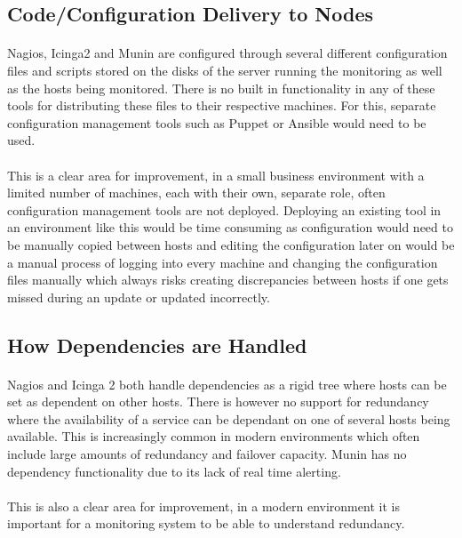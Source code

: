 \documentclass[bsc,logo,twoside,singlespacing,notimes]{infthesis}
\begin{document}
\subsection{Code/Configuration Delivery to Nodes}
\paragraph*{}
	Nagios, Icinga2 and Munin are configured through several different
	configuration files and scripts stored on the disks of the server running the
	monitoring as well as the hosts being monitored.  There is no built in
	functionality in any of these tools for distributing these files to their
	respective machines.  For this, separate configuration management tools such as
	Puppet or Ansible would need to be used.
	
\paragraph*{}
	This is a clear area for improvement, in a small business environment with a
	limited number of machines, each with their own, separate role, often
	configuration management tools are not deployed.  Deploying an existing tool
	in an environment like this would be time consuming as configuration would need
	to be manually copied between hosts and editing the configuration later on
	would be a manual process of logging into every machine and changing the
	configuration files manually which always risks creating discrepancies between
	hosts if one gets missed during an update or updated incorrectly.

\subsection{How Dependencies are Handled}
\paragraph*{}
	Nagios and Icinga 2 both handle dependencies as a rigid tree where hosts can
	be set as dependent on other hosts.  There is however no support for redundancy
	where the availability of a service can be dependant on one of several hosts
	being available. This is increasingly common in modern environments which often
	include large amounts of redundancy and failover capacity. Munin has no
	dependency functionality due to its lack of real time alerting.
	
\paragraph*{}
	This is also a clear area for improvement, in a modern environment it is
	important for a monitoring system to be able to understand redundancy.
\end{document}
